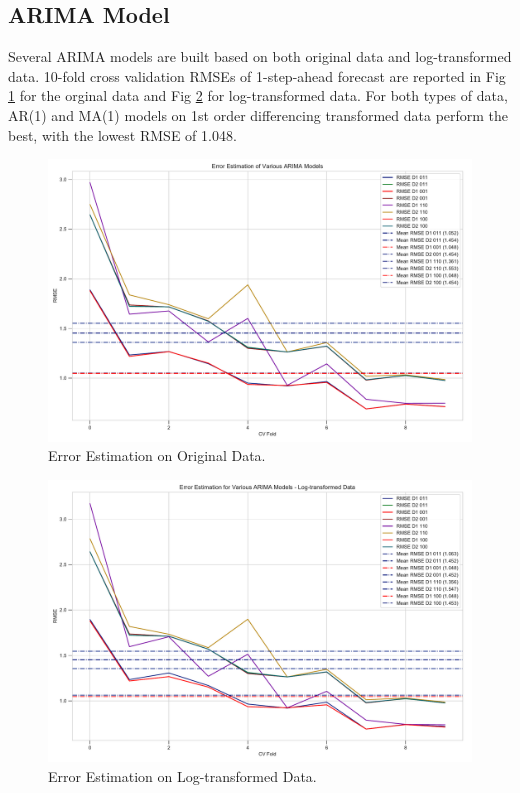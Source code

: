 \documentclass[]{article}
\begin{document}
\subsection{ARIMA Model}
Several ARIMA models are built based on both original data and log-transformed data. 10-fold cross validation RMSEs of 1-step-ahead forecast are reported in Fig \ref{fig:error_estimation_1} for the orginal data and Fig \ref{fig:error_estimation_2} for log-transformed data. For both types of data, AR(1) and MA(1) models on 1st order differencing transformed data perform the best, with the lowest RMSE of 1.048. 

%
\begin{figure}[hbtp]
	\centering
	\includegraphics[width=1\columnwidth]{../Figures/error_estimation_1.pdf}
	\caption{Error Estimation on Original Data.}
	\label{fig:error_estimation_1}
\end{figure}
%
%
\begin{figure}[hbtp]
	\centering
	\includegraphics[width=1\columnwidth]{../Figures/error_estimation_2.pdf}
	\caption{Error Estimation on Log-transformed Data.}
	\label{fig:error_estimation_2}
\end{figure}
%
\end{document}
